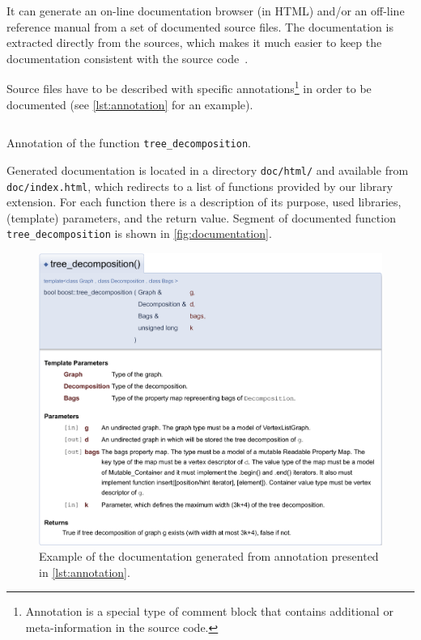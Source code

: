 \documentclass[thesis=B,english]{FITthesis}[2019/03/21]
\begin{document}
It can generate an on-line documentation browser (in HTML) and/or an off-line reference manual from a set of documented source files. The documentation is extracted directly from the sources, which makes it much easier to keep the documentation consistent with the source code~\cite{doxygen}.

Source files have to be described with specific annotations\footnote{Annotation is a special type of comment block that contains additional or meta-information in the source code.} in order to be documented (see \autoref{lst:annotation} for an example).

\begin{listing}[H]
	\inputminted[tabsize=2,breaklines,bgcolor=codebg]{c++}{snippets/annotation.m}
	\caption[Annotation of the function \texttt{tree\_decomposition}]{Annotation of the function \texttt{tree\_decomposition}.}
	\label{lst:annotation}
\end{listing}

Generated documentation is located in a directory \texttt{doc/html/} and available from \texttt{doc/index.html}, which redirects to a list of functions provided by our library extension. For each function there is a description of its purpose, used libraries, (template) parameters, and the return value. Segment of documented function \texttt{tree\_decomposition} is shown in \autoref{fig:documentation}.

\begin{figure}[H]
	\centering
 	\includegraphics[width=1\textwidth]{img/documentation}
 	\caption[Example of the documentation generated from annotation presented in \autoref{lst:annotation}]{Example of the documentation generated from annotation presented in \autoref{lst:annotation}.}
 	\label{fig:documentation}
\end{figure}
\end{document}

